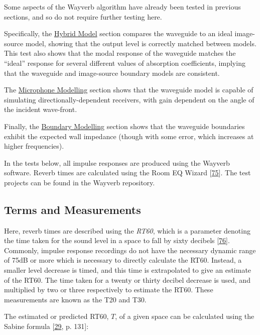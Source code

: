 \documentclass[]{scrreprt}
\begin{document}
Some aspects of the Wayverb algorithm have already been tested in
previous sections, and so do not require further testing here.

Specifically, the
\href{\%7B\%7B\%20site.baseurl\%20\%7D\%7D\%7B\%\%20link\%20hybrid.md\%20\%\%7D}{Hybrid
Model} section compares the waveguide to an ideal image-source model,
showing that the output level is correctly matched between models. This
test also shows that the modal response of the waveguide matches the
``ideal'' response for several different values of absorption
coefficients, implying that the waveguide and image-source boundary
models are consistent.

The
\href{\%7B\%7B\%20site.baseurl\%20\%7D\%7D\%7B\%\%20link\%20microphone.md\%20\%\%7D}{Microphone
Modelling} section shows that the waveguide model is capable of
simulating directionally-dependent receivers, with gain dependent on the
angle of the incident wave-front.

Finally, the
\href{\%7B\%7B\%20site.baseurl\%20\%7D\%7D\%7B\%\%20link\%20boundary.md\%20\%\%7D}{Boundary
Modelling} section shows that the waveguide boundaries exhibit the
expected wall impedance (though with some error, which increases at
higher frequencies).

In the tests below, all impulse responses are produced using the Wayverb
software. Reverb times are calculated using the Room EQ Wizard
{[}\protect\hyperlink{ref-ux5froomux5f2017}{75}{]}. The test projects
can be found in the Wayverb repository.

\subsection{Terms and Measurements}\label{terms-and-measurements}

Here, reverb times are described using the \emph{RT60}, which is a
parameter denoting the time taken for the sound level in a space to fall
by sixty decibels
{[}\protect\hyperlink{ref-ux5freverberationux5f2017}{76}{]}. Commonly,
impulse response recordings do not have the necessary dynamic range of
75dB or more which is necessary to directly calculate the RT60. Instead,
a smaller level decrease is timed, and this time is extrapolated to give
an estimate of the RT60. The time taken for a twenty or thirty decibel
decrease is used, and multiplied by two or three respectively to
estimate the RT60. These measurements are known as the T20 and T30.

The estimated or predicted RT60, \(T\), of a given space can be
calculated using the Sabine formula
{[}\protect\hyperlink{ref-kuttruffux5froomux5f2009}{29}, p. 131{]}:
\end{document}
